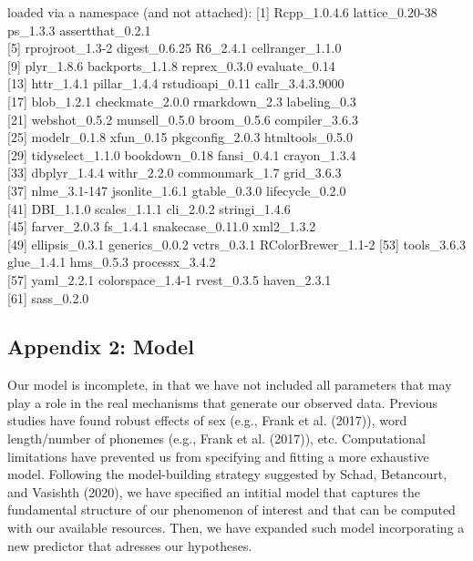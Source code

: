 \documentclass[english,man,man,floatsintext]{apa6}
\begin{document}
loaded via a namespace (and not attached):
{[}1{]} Rcpp\_1.0.4.6 lattice\_0.20-38 ps\_1.3.3 assertthat\_0.2.1\\
{[}5{]} rprojroot\_1.3-2 digest\_0.6.25 R6\_2.4.1 cellranger\_1.1.0\\
{[}9{]} plyr\_1.8.6 backports\_1.1.8 reprex\_0.3.0 evaluate\_0.14\\
{[}13{]} httr\_1.4.1 pillar\_1.4.4 rstudioapi\_0.11 callr\_3.4.3.9000\\
{[}17{]} blob\_1.2.1 checkmate\_2.0.0 rmarkdown\_2.3 labeling\_0.3\\
{[}21{]} webshot\_0.5.2 munsell\_0.5.0 broom\_0.5.6 compiler\_3.6.3\\
{[}25{]} modelr\_0.1.8 xfun\_0.15 pkgconfig\_2.0.3 htmltools\_0.5.0\\
{[}29{]} tidyselect\_1.1.0 bookdown\_0.18 fansi\_0.4.1 crayon\_1.3.4\\
{[}33{]} dbplyr\_1.4.4 withr\_2.2.0 commonmark\_1.7 grid\_3.6.3\\
{[}37{]} nlme\_3.1-147 jsonlite\_1.6.1 gtable\_0.3.0 lifecycle\_0.2.0\\
{[}41{]} DBI\_1.1.0 scales\_1.1.1 cli\_2.0.2 stringi\_1.4.6\\
{[}45{]} farver\_2.0.3 fs\_1.4.1 snakecase\_0.11.0 xml2\_1.3.2\\
{[}49{]} ellipsis\_0.3.1 generics\_0.0.2 vctrs\_0.3.1 RColorBrewer\_1.1-2
{[}53{]} tools\_3.6.3 glue\_1.4.1 hms\_0.5.3 processx\_3.4.2\\
{[}57{]} yaml\_2.2.1 colorspace\_1.4-1 rvest\_0.3.5 haven\_2.3.1\\
{[}61{]} sass\_0.2.0

\hypertarget{appendix-2-model}{%
\subsection{Appendix 2: Model}\label{appendix-2-model}}

Our model is incomplete, in that we have not included all parameters that may play a role in the real mechanisms that generate our observed data. Previous studies have found robust effects of sex (e.g., Frank et al. (2017)), word length/number of phonemes (e.g., Frank et al. (2017)), etc. Computational limitations have prevented us from specifying and fitting a more exhaustive model. Following the model-building strategy suggested by Schad, Betancourt, and Vasishth (2020), we have specified an intitial model that captures the fundamental structure of our phenomenon of interest and that can be computed with our available resources. Then, we have expanded such model incorporating a new predictor that adresses our hypotheses.
\end{document}
